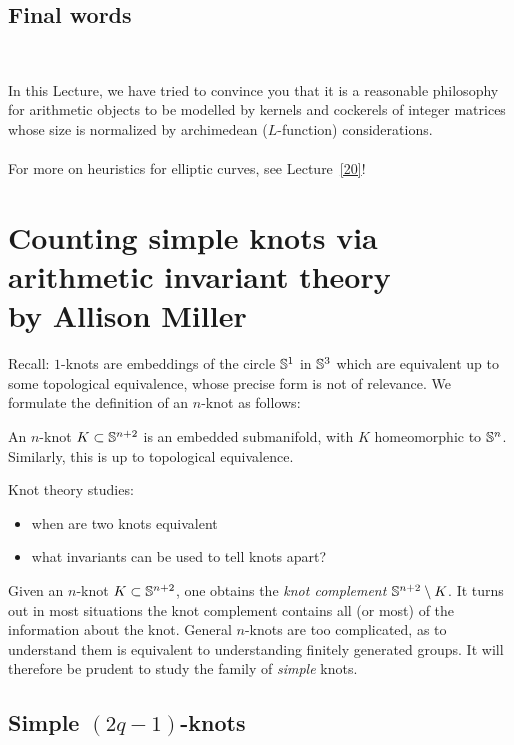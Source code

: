 \documentclass[12pt,amsfont]{amsart}
\begin{document}
\subsection{Final words}
{\ }

In this Lecture, we have tried to convince you that it is a reasonable philosophy for arithmetic objects to be modelled by kernels and cockerels of integer matrices whose size is normalized by archimedean ($L$-function) considerations. \\ \\
For more on heuristics for elliptic curves, see Lecture~\ref{20}!

\renewcommand{\thesubsection}{\arabic{section}.R}
\begingroup
\renewcommand{\addcontentsline}[3]{}%
\endgroup
\newpage
\renewcommand{\thesubsection}{\arabic{section}.\arabic{subsection}}

\section{Counting simple knots via arithmetic invariant theory \\
by Allison Miller}\label{7}
Recall: $1$-knots are embeddings of the circle ${\mathbb S}^1$ in ${\mathbb S}^3$ which are equivalent up to some topological equivalence, whose precise form is not of relevance.  We formulate the definition of an $n$-knot as follows:
\begin{dfn}
An $n$-knot $K \subset {\mathbb S}^{n+2}$ is an embedded submanifold, with $K$ homeomorphic to ${\mathbb S}^n$. Similarly, this is up to topological equivalence.
\end{dfn}
Knot theory studies:
\begin{itemize}
\item
when are two knots equivalent
\item
what invariants can be used to tell knots apart?
\end{itemize}

Given an $n$-knot $K \subset {\mathbb S}^{n+2}$, one obtains the \emph{knot complement} ${\mathbb S}^{n+2} \setminus K$. It turns out in most situations the knot complement contains  all (or most) of the information about the knot. General $n$-knots are too complicated, as to understand them is equivalent to understanding finitely generated groups. It will therefore be prudent to study the family of \emph{simple} knots. 

\subsection{Simple $(2q-1)$-knots}
\end{document}
